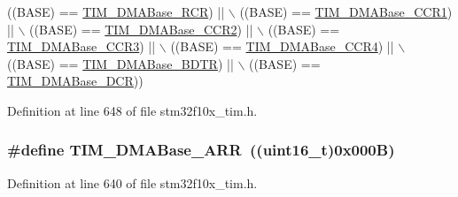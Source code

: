 \begin{DoxyCode}
                               ((BASE) == \hyperlink{group___t_i_m___d_m_a___base__address_ga97f9edceee5c99b32aaa2c6daf849b7d}{TIM\_DMABase\_RCR}) || \(\backslash\)
                               ((BASE) == \hyperlink{group___t_i_m___d_m_a___base__address_ga235a47fa47fd19594a111e6e48c0d5a2}{TIM\_DMABase\_CCR1}) || \(\backslash\)
                               ((BASE) == \hyperlink{group___t_i_m___d_m_a___base__address_ga0e2150dcd3afe31ecb793aa471b3b972}{TIM\_DMABase\_CCR2}) || \(\backslash\)
                               ((BASE) == \hyperlink{group___t_i_m___d_m_a___base__address_ga590c90085bd2b206b941dff2731fed74}{TIM\_DMABase\_CCR3}) || \(\backslash\)
                               ((BASE) == \hyperlink{group___t_i_m___d_m_a___base__address_ga5e84a16e7d8ea369a3a55bb6fe1f2171}{TIM\_DMABase\_CCR4}) || \(\backslash\)
                               ((BASE) == \hyperlink{group___t_i_m___d_m_a___base__address_gaaff22bbf3091c47783c1c68b648c8605}{TIM\_DMABase\_BDTR}) || \(\backslash\)
                               ((BASE) == \hyperlink{group___t_i_m___d_m_a___base__address_ga59e2206e4e03b9d55c9fb5a24e29b01c}{TIM\_DMABase\_DCR}))
\end{DoxyCode}


Definition at line 648 of file stm32f10x\+\_\+tim.\+h.

\subsubsection[{\texorpdfstring{T\+I\+M\+\_\+\+D\+M\+A\+Base\+\_\+\+A\+RR}{TIM_DMABase_ARR}}]{\setlength{\rightskip}{0pt plus 5cm}\#define T\+I\+M\+\_\+\+D\+M\+A\+Base\+\_\+\+A\+RR~(({\bf uint16\+\_\+t})0x000\+B)}\hypertarget{group___t_i_m___d_m_a___base__address_gaab8a66f70e59b5916b4bba344746d652}{}\label{group___t_i_m___d_m_a___base__address_gaab8a66f70e59b5916b4bba344746d652}


Definition at line 640 of file stm32f10x\+\_\+tim.\+h.

